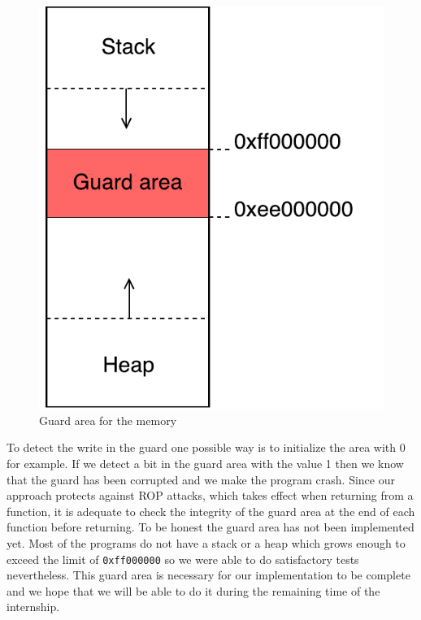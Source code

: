 \documentclass[11pt]{sdm}
\begin{document}
\begin{figure}[!ht]
\centering
\includegraphics[scale=0.6]{images/guard.pdf}
\caption{Guard area for the memory}
\label{guard}
\end{figure}

To detect the write in the guard one possible way is to initialize the area with 0 for example. If we detect a bit in the guard area with the value 1 then we know that the guard has been corrupted and we make the program crash. Since our approach protects against ROP attacks, which takes effect when returning from a function, it is adequate to check the integrity of the guard area at the end of each function before returning.
To be honest the guard area has not been implemented yet. Most of the programs do not have a stack or a heap which grows enough to exceed the limit of \texttt{0xff000000} so we were able to do satisfactory tests nevertheless. This guard area is necessary for our implementation to be complete and we hope that we will be able to do it during the remaining time of the internship.
\end{document}

